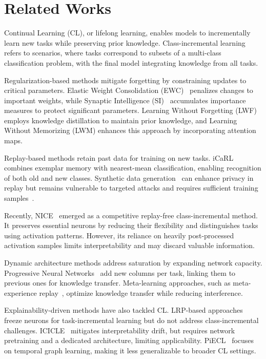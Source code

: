 \section{Related Works}
Continual Learning (CL), or lifelong learning, enables models to incrementally learn new tasks while preserving prior knowledge. Class-incremental learning~\cite{masana2022class} refers to scenarios, where tasks correspond to subsets of a multi-class classification problem, with the final model integrating knowledge from all tasks.  

Regularization-based methods mitigate forgetting by constraining updates to critical parameters. Elastic Weight Consolidation (EWC)~\cite{Kirkpatrick2017overcoming} penalizes changes to important weights, while Synaptic Intelligence (SI)~\cite{Zenke2017continual} accumulates importance measures to protect significant parameters. Learning Without Forgetting (LWF)~\cite{lwf} employs knowledge distillation to maintain prior knowledge, and Learning Without Memorizing (LWM) enhances this approach by incorporating attention maps.  

Replay-based methods retain past data for training on new tasks. iCaRL~\cite{Rebuffi2017iCaRL} combines exemplar memory with nearest-mean classification, enabling recognition of both old and new classes. Synthetic data generation~\cite{sarmin2024syntheticdatarevisitingprivacyutility} can enhance privacy in replay but remains vulnerable to targeted attacks and requires sufficient training samples~\cite{lu2023machine}.  

Recently, NICE~\cite{Gurbuz2024nice} emerged as a competitive replay-free class-incremental method. It preserves essential neurons by reducing their flexibility and distinguishes tasks using activation patterns. However, its reliance on heavily post-processed activation samples limits interpretability and may discard valuable information.  

Dynamic architecture methods address saturation by expanding network capacity. Progressive Neural Networks~\cite{Rusu2016progressive} add new columns per task, linking them to previous ones for knowledge transfer. Meta-learning approaches, such as meta-experience replay~\cite{Riemer2019learning}, optimize knowledge transfer while reducing interference.  

Explainability-driven methods have also tackled CL. LRP-based approaches~\cite{explain_not_forget} freeze neurons for task-incremental learning but do not address class-incremental challenges. ICICLE~\cite{rymarczyk2023icicle} mitigates interpretability drift, but requires network pretraining and a dedicated architecture, limiting applicability. PiECL~\cite{graphexp} focuses on temporal graph learning, making it less generalizable to broader CL settings.